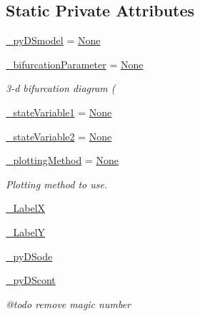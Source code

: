 \subsection*{Static Private Attributes}
\begin{DoxyCompactItemize}
\item 
\hyperlink{class_mu_mo_t_1_1_mu_mo_tbifurcation_view_a9e9a430da6d323cc4411c070e0c7eee5}{\+\_\+py\+D\+Smodel} = \hyperlink{class_mu_mo_t_1_1_mu_mo_tbifurcation_view_ac7485dcc8d256a6f197ed7802687f252}{None}
\item 
\hyperlink{class_mu_mo_t_1_1_mu_mo_tbifurcation_view_a17d5bd0e623faea6f50fc3b7f01d0d38}{\+\_\+bifurcation\+Parameter} = \hyperlink{class_mu_mo_t_1_1_mu_mo_tbifurcation_view_ac7485dcc8d256a6f197ed7802687f252}{None}
\begin{DoxyCompactList}\small\item\em 3-\/d bifurcation diagram ( \end{DoxyCompactList}\item 
\hyperlink{class_mu_mo_t_1_1_mu_mo_tbifurcation_view_aa14fa36730691becc6f3136899545416}{\+\_\+state\+Variable1} = \hyperlink{class_mu_mo_t_1_1_mu_mo_tbifurcation_view_ac7485dcc8d256a6f197ed7802687f252}{None}
\item 
\hyperlink{class_mu_mo_t_1_1_mu_mo_tbifurcation_view_a9d3705d1d9182e10751ff693573d6d16}{\+\_\+state\+Variable2} = \hyperlink{class_mu_mo_t_1_1_mu_mo_tbifurcation_view_ac7485dcc8d256a6f197ed7802687f252}{None}
\item 
\hyperlink{class_mu_mo_t_1_1_mu_mo_tbifurcation_view_a72e3294250042322910555edb2ef8f9d}{\+\_\+plotting\+Method} = \hyperlink{class_mu_mo_t_1_1_mu_mo_tbifurcation_view_ac7485dcc8d256a6f197ed7802687f252}{None}
\begin{DoxyCompactList}\small\item\em Plotting method to use. \end{DoxyCompactList}\item 
\hyperlink{class_mu_mo_t_1_1_mu_mo_tbifurcation_view_a1ae22852e6ebc2a6b1cdfee3383063e9}{\+\_\+\+LabelX}
\item 
\hyperlink{class_mu_mo_t_1_1_mu_mo_tbifurcation_view_ae2c6b16828eec194022056d04af84f16}{\+\_\+\+LabelY}
\item 
\hyperlink{class_mu_mo_t_1_1_mu_mo_tbifurcation_view_a45f0a60363e440604d8e5b08930eb7b5}{\+\_\+py\+D\+Sode}
\item 
\hyperlink{class_mu_mo_t_1_1_mu_mo_tbifurcation_view_a797e92fe19ce2636a49bf1400a69fc49}{\+\_\+py\+D\+Scont}
\begin{DoxyCompactList}\small\item\em @todo remove magic number \end{DoxyCompactList}\item 

\end{DoxyCompactItemize}
